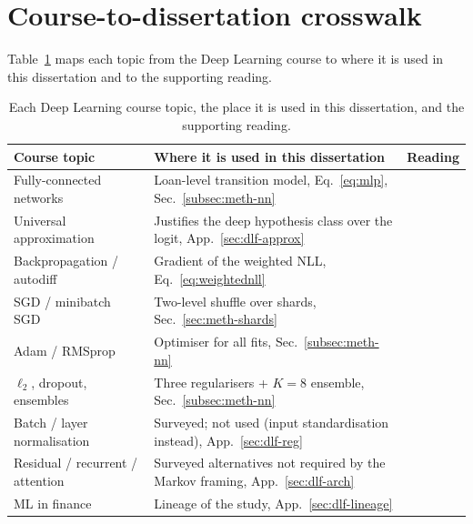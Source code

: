 \section{Course-to-dissertation crosswalk}
\label{sec:dlf-crosswalk}

Table~\ref{tab:dlcrosswalk} maps each topic from the Deep Learning
course to where it is used in this dissertation and to the supporting
reading.

\begin{table}[htbp]
\centering
\small
\renewcommand{\arraystretch}{1.2}
\begin{tabularx}{\textwidth}{@{}lXl@{}}
\toprule
\textbf{Course topic} & \textbf{Where it is used in this dissertation} & \textbf{Reading} \\
\midrule
Fully-connected networks &
  Loan-level transition model, Eq.~\eqref{eq:mlp}, Sec.~\ref{subsec:meth-nn} &
  \citealp{goodfellow2016} \\
Universal approximation &
  Justifies the deep hypothesis class over the logit, App.~\ref{sec:dlf-approx} &
  \citealp{cybenko1989,hornik1991} \\
Backpropagation / autodiff &
  Gradient of the weighted NLL, Eq.~\eqref{eq:weightednll} &
  \citealp{rumelhart1986} \\
SGD / minibatch SGD &
  Two-level shuffle over shards, Sec.~\ref{sec:meth-shards} &
  \citealp{robbins1951,bottou2018} \\
Adam / RMSprop &
  Optimiser for all fits, Sec.~\ref{subsec:meth-nn} &
  \citealp{kingma2015,tieleman2012} \\
$\ell_2$, dropout, ensembles &
  Three regularisers + $K{=}8$ ensemble, Sec.~\ref{subsec:meth-nn} &
  \citealp{hastie2009,dropout} \\
Batch / layer normalisation &
  Surveyed; not used (input standardisation instead), App.~\ref{sec:dlf-reg} &
  \citealp{ioffe2015,ba2016} \\
Residual / recurrent / attention &
  Surveyed alternatives not required by the Markov framing, App.~\ref{sec:dlf-arch} &
  \citealp{he2016,hochreiter1997,vaswani2017} \\
ML in finance &
  Lineage of the study, App.~\ref{sec:dlf-lineage} &
  \citealp{sirignano2021,gukellyxiu2020,khandani2010,fuster2022} \\
\bottomrule
\end{tabularx}
\caption[Deep Learning course topics mapped to dissertation methods]{Each
Deep Learning course topic, the place it is used in this dissertation,
and the supporting reading.}
\label{tab:dlcrosswalk}
\end{table}
